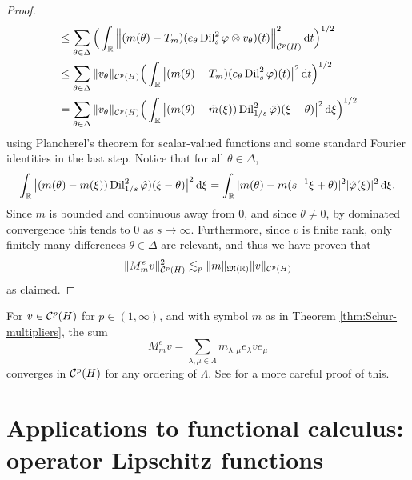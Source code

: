 \begin{proof}
\begin{equation*}
\begin{aligned}
      &\leq \sum_{\theta \in \Delta} \Big( \int_{\mathbb{R}} \Big\| (m(\theta) - T_{m}) (e_{\theta} \operatorname{Dil}_{s}^{2} \varphi \otimes v_{\theta})(t) \Big\|_{\mathcal{C}^{p}(H)}^{2}  \, \mathrm{d} t \Big)^{1/2} \\
      &\leq \sum_{\theta \in \Delta} \|v_{\theta}\|_{\mathcal{C}^{p}(H)} \Big( \int_{\mathbb{R}} \big| (m(\theta) - T_{m}) (e_{\theta} \operatorname{Dil}_{s}^{2} \varphi)(t) \big|^{2}  \, \mathrm{d} t \Big)^{1/2} \\
      &= \sum_{\theta \in \Delta} \|v_{\theta}\|_{\mathcal{C}^{p}(H)} \Big( \int_{\mathbb{R}} \big| (m(\theta) - \tilde{m}(\xi)) \operatorname{Dil}_{1/s}^{2} \hat{\varphi})(\xi - \theta) \big|^{2}  \, \mathrm{d} \xi \Big)^{1/2}
    \end{aligned}
  \end{equation*}
  using Plancherel's theorem for scalar-valued functions and some standard Fourier identities in the last step.
  Notice that for all $\theta \in \Delta$,
  \begin{equation*}
       \int_{\mathbb{R}} \big| (m(\theta) - m(\xi)) \operatorname{Dil}_{1/s}^{2} \hat{\varphi})(\xi - \theta) \big|^{2}  \, \mathrm{d} \xi
      =  \int_{\mathbb{R}} |m(\theta) - m(s^{-1}\xi + \theta)|^{2} |\hat{\varphi}(\xi)|^{2}  \, \mathrm{d} \xi .
  \end{equation*}
  Since $m$ is bounded and continuous away from $0$, and since $\theta \neq 0$, by dominated convergence this tends to $0$ as $s  \to \infty$.
  Furthermore, since $v$ is finite rank, only finitely many differences $\theta \in \Delta$ are relevant, and thus we have proven that
  \begin{equation*}
     \| M_{m}^{e} v \|_{\mathcal{C}^{p}(H)}^{2} \lesssim_{p} \|m\|_{\mathfrak{M}(\mathbb{R})} \|v\|_{\mathcal{C}^{p}(H)}
   \end{equation*}
   as claimed.
 \end{proof}

 \begin{rmk}
   For $v \in \mathcal{C}^{p}(H)$ for $p \in (1,\infty)$, and with symbol $m$ as in Theorem \ref{thm:Schur-multipliers}, the sum
   \begin{equation*} 
     M_{m}^{e} v = \sum_{\lambda,\mu \in \Lambda} m_{\lambda,\mu} e_{\lambda} v e_{\mu}
   \end{equation*}
   converges in $\mathcal{C}^{p}(H)$ for any ordering of $\Lambda$.
   See \cite[Theorem 5.4.3]{HNVW16} for a more careful proof of this.
 \end{rmk}

\section{Applications to functional calculus: operator Lipschitz functions}

